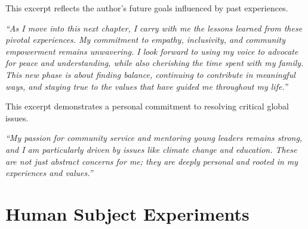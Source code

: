\noindent This excerpt reflects the author's future goals influenced by past experiences.
\begin{mdframed}
\textit{``As I move into this next chapter, I carry with me the lessons learned from these pivotal experiences. My commitment to empathy, inclusivity, and community empowerment remains unwavering. I look forward to using my voice to advocate for peace and understanding, while also cherishing the time spent with my family. This new phase is about finding balance, continuing to contribute in meaningful ways, and staying true to the values that have guided me throughout my life.''}
\end{mdframed}

\noindent This excerpt demonstrates a personal commitment to resolving critical global issues.
\begin{mdframed}
\textit{``My passion for community service and mentoring young leaders remains strong, and I am particularly driven by issues like climate change and education. These are not just abstract concerns for me; they are deeply personal and rooted in my experiences and values.''}
\end{mdframed}
\clearpage

\section{Human Subject Experiments}\label{appendix: Questionnaire}
